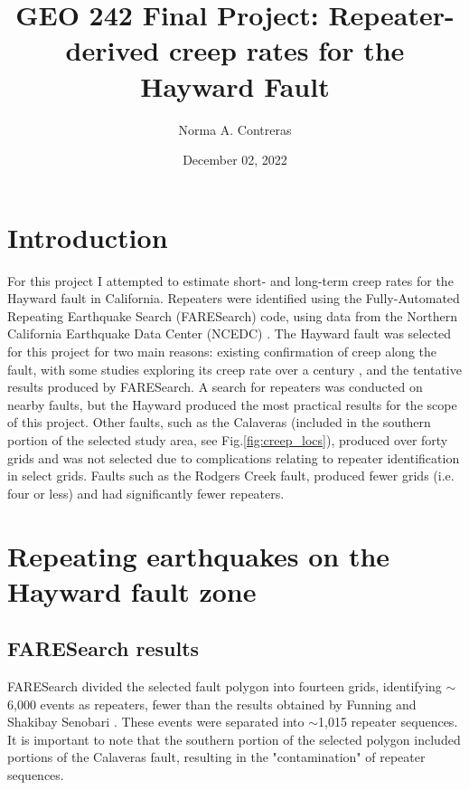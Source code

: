 \documentclass{article}
\title{GEO 242 Final Project: Repeater-derived creep rates for the Hayward Fault}
\author{Norma A. Contreras}
\date{December 02, 2022}
\begin{document}
\maketitle

\section{Introduction}
For this project I attempted to estimate short- and long-term creep rates for the Hayward fault in California. Repeaters were identified using the Fully-Automated Repeating Earthquake Search (FARESearch) code, using data from the Northern California Earthquake Data Center (NCEDC) \cite{funning21,ncedc}. The Hayward fault was selected for this project for two main reasons: existing confirmation of creep along the fault, with some studies exploring its creep rate over a century \cite{lienkaemper91}, and the tentative results produced by FARESearch. A search for repeaters was conducted on nearby faults, but the Hayward produced the most practical results for the scope of this project. Other faults, such as the Calaveras (included in the southern portion of the selected study area, see Fig.\ref{fig:creep_locs}), produced over forty grids and was not selected due to complications relating to repeater identification in select grids. Faults such as the Rodgers Creek fault, produced fewer grids (i.e. four or less) and had significantly fewer repeaters. 

\section{Repeating earthquakes on the Hayward fault zone}
\subsection{FARESearch results}
FARESearch divided the selected fault polygon into fourteen grids, identifying $\sim$6,000 events as repeaters, fewer than the results obtained by Funning and Shakibay Senobari \cite{funning21}. These events were separated into $\sim$1,015 repeater sequences. It is important to note that the southern portion of the selected polygon included portions of the Calaveras fault, resulting in the "contamination" of repeater sequences. 
\end{document}
